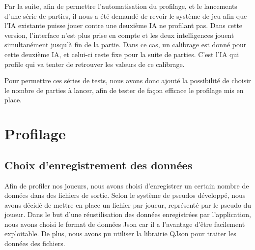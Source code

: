 \documentclass{report}
\begin{document}
Par la suite, afin de permettre l'automatisation du profilage, et le lancements d'une série de parties, il nous a été demandé de revoir le système de jeu afin que l'IA existante puisse jouer contre une deuxième IA ne profilant pas. Dans cette version, l'interface n'est plus prise en compte et les deux intelligences jouent simultanément jusqu'à fin de la partie. Dans ce cas, un calibrage est donné pour cette deuxième IA, et celui-ci reste fixe pour la suite de parties. C'est l'IA qui profile qui va tenter de retrouver les valeurs de ce calibrage.\par
Pour permettre ces séries de tests, nous avons donc ajouté la possibilité de choisir le nombre de parties à lancer, afin de tester de façon efficace le profilage mis en place.

\section{Profilage}
\subsection{Choix d'enregistrement des données}

\hspace{0.5cm}Afin de profiler nos joueurs, nous avons choisi d'enregistrer un certain nombre de données dans des fichiers de sortie. Selon le système de pseudos développé, nous avons décidé de mettre en place un fichier par joueur, représenté par le pseudo du joueur. Dans le but d'une réustilisation des données enregistrées par l'application, nous avons choisi le format de données Json car il a l'avantage d'être facilement exploitable. De plus, nous avons pu utiliser la librairie QJson pour traiter les données des fichiers.\\
\end{document}
